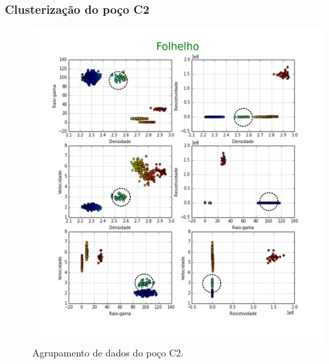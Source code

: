 \documentclass[aspectratio=10]{beamer} %
\begin{document}
\begin{frame}
\frametitle{Clusterização do poço C2}
\begin{figure}[H]
\centering
\includegraphics[scale=0.4]{Imagens/folhelhoC2.png}
\caption{Agrupamento de dados do poço C2.}
\end{figure} 
\end{frame}
\end{document}
